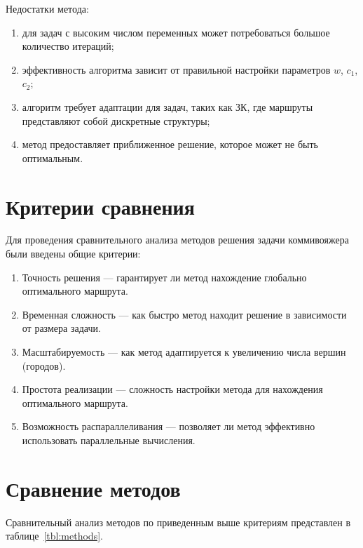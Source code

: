 Недостатки метода:
\begin{enumerate}
    \item для задач с высоким числом переменных может потребоваться большое количество итераций;
    \item эффективность алгоритма зависит от правильной настройки параметров \(w\), \(c_1\), \(c_2\);
    \item алгоритм требует адаптации для задач, таких как ЗК, где маршруты представляют собой дискретные структуры;
    \item метод предоставляет приближенное решение, которое может не быть оптимальным.
\end{enumerate}

\section{Критерии сравнения}
Для проведения сравнительного анализа методов решения задачи коммивояжера были введены общие критерии:
\begin{enumerate}
    \item Точность решения --- гарантирует ли метод нахождение глобально оптимального маршрута.
    \item Временная сложность --- как быстро метод находит решение в зависимости от размера задачи.
    \item Масштабируемость --- как метод адаптируется к увеличению числа вершин (городов).
    \item Простота реализации — сложность настройки метода для нахождения оптимального маршрута.
    \item Возможность распараллеливания --- позволяет ли метод эффективно использовать параллельные вычисления.
\end{enumerate}
\section{Сравнение методов}
Сравнительный анализ методов по приведенным выше критериям представлен в таблице~\ref{tbl:methods}.

